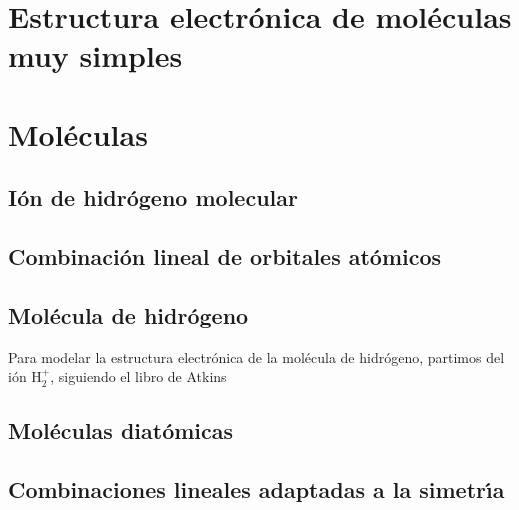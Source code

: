 \chapter{Estructura electr\'{o}nica de mol\'{e}culas muy simples}
\label{C:estr-electr-molec-simple}

\chapter{Mol\'{e}culas}
\label{C:moleculas}

\section{I\'{o}n de hidr\'{o}geno molecular}
\label{S:ion-de-hidrogeno}

\section{Combinaci\'{o}n lineal de orbitales at\'{o}micos}
\label{S:comb-line-orbit-atom}

\section{Mol\'{e}cula de hidr\'{o}geno}
\label{S:molec-de-hidr}

Para modelar la estructura electr\'{o}nica de la mol\'{e}cula de hidr\'{o}geno, partimos del i\'{o}n $\mathrm{H}_{2}^{+}$, siguiendo el libro de Atkins 

\section{Mol\'{e}culas diat\'{o}micas}
\label{S:moleculas-diatomicas}

\section{Combinaciones lineales adaptadas a la simetr\'{\i}a}
\label{S:comb-line-adapt}





